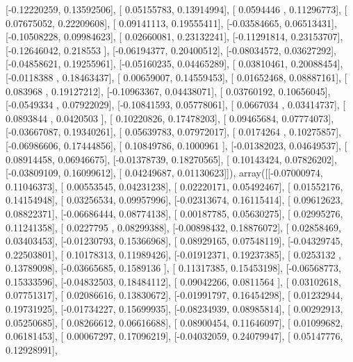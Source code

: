 \documentclass{article}
\begin{document}
       [-0.12220259,  0.13592506],
       [ 0.05155783,  0.13914994],
       [ 0.0594446 ,  0.11296773],
       [ 0.07675052,  0.22209608],
       [ 0.09141113,  0.19555411],
       [-0.03584665,  0.06513431],
       [-0.10508228,  0.09984623],
       [ 0.02660081,  0.23132241],
       [-0.11291814,  0.23153707],
       [-0.12646042,  0.218553  ],
       [-0.06194377,  0.20400512],
       [-0.08034572,  0.03627292],
       [-0.04858621,  0.19255961],
       [-0.05160235,  0.04465289],
       [ 0.03810461,  0.20088454],
       [-0.0118388 ,  0.18463437],
       [ 0.00659007,  0.14559453],
       [ 0.01652468,  0.08887161],
       [ 0.083968  ,  0.19127212],
       [-0.10963367,  0.04438071],
       [ 0.03760192,  0.10656045],
       [-0.0549334 ,  0.07922029],
       [-0.10841593,  0.05778061],
       [ 0.0667034 ,  0.03414737],
       [ 0.0893844 ,  0.0420503 ],
       [ 0.10220826,  0.17478203],
       [ 0.09465684,  0.07774073],
       [-0.03667087,  0.19340261],
       [ 0.05639783,  0.07972017],
       [ 0.0174264 ,  0.10275857],
       [-0.06986606,  0.17444856],
       [ 0.10849786,  0.1000961 ],
       [-0.01382023,  0.04649537],
       [ 0.08914458,  0.06946675],
       [-0.01378739,  0.18270565],
       [ 0.10143424,  0.07826202],
       [-0.03809109,  0.16099612],
       [ 0.04249687,  0.01130623]]), array([[-0.07000974,  0.11046373],
       [ 0.00553545,  0.04231238],
       [ 0.02220171,  0.05492467],
       [ 0.01552176,  0.14154948],
       [ 0.03256534,  0.09957996],
       [-0.02313674,  0.16115414],
       [ 0.09612623,  0.08822371],
       [-0.06686444,  0.08774138],
       [ 0.00187785,  0.05630275],
       [ 0.02995276,  0.11241358],
       [ 0.0227795 ,  0.08299388],
       [-0.00898432,  0.18876072],
       [ 0.02858469,  0.03403453],
       [-0.01230793,  0.15366968],
       [ 0.08929165,  0.07548119],
       [-0.04329745,  0.22503801],
       [ 0.10178313,  0.11989426],
       [-0.01912371,  0.19237385],
       [ 0.0253132 ,  0.13789098],
       [-0.03665685,  0.1589136 ],
       [ 0.11317385,  0.15453198],
       [-0.06568773,  0.15333596],
       [-0.04832503,  0.18484112],
       [ 0.09042266,  0.0811564 ],
       [ 0.03102618,  0.07751317],
       [ 0.02086616,  0.13830672],
       [-0.01991797,  0.16454298],
       [ 0.01232944,  0.19731925],
       [-0.01734227,  0.15699935],
       [-0.08234939,  0.08985814],
       [ 0.00292913,  0.05250685],
       [ 0.08266612,  0.06616688],
       [ 0.08900454,  0.11646097],
       [ 0.01099682,  0.06181453],
       [ 0.00067297,  0.17096219],
       [-0.04032059,  0.24079947],
       [ 0.05147776,  0.12928991],
\end{document}
